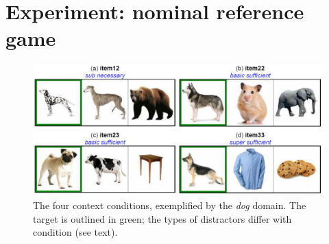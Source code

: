 \documentclass[10pt,letterpaper]{article}
\newcommand{\ndg}[1]{\textcolor{Green}{[ndg: #1]}}
\begin{document}
\section{Experiment: nominal reference game}






\begin{figure}[bt!]
\centering
\includegraphics[width=.5\textwidth]{graphs/design}
\caption{The four context conditions, exemplified by the \textit{dog} domain. The target is outlined in green; the types of distractors differ with condition (see text).
}
\label{fig:design}
\end{figure}
\end{document}
